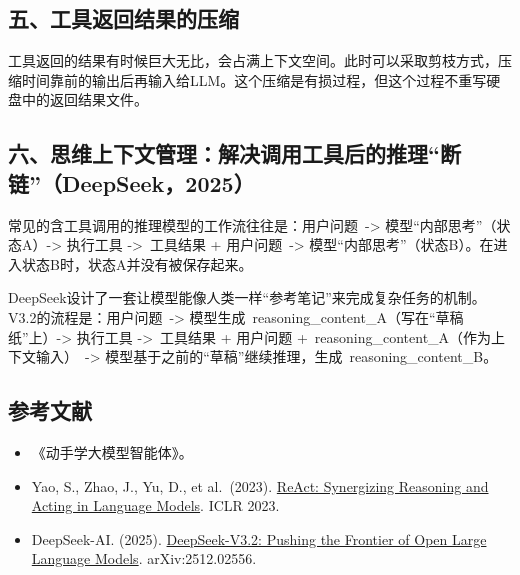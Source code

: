 \hypertarget{ux4e94ux5de5ux5177ux8fd4ux56deux7ed3ux679cux7684ux538bux7f29}{%
\subsection{五、工具返回结果的压缩}\label{ux4e94ux5de5ux5177ux8fd4ux56deux7ed3ux679cux7684ux538bux7f29}}

工具返回的结果有时候巨大无比，会占满上下文空间。此时可以采取剪枝方式，压缩时间靠前的输出后再输入给LLM。这个压缩是有损过程，但这个过程不重写硬盘中的返回结果文件。

\hypertarget{ux516dux601dux7ef4ux4e0aux4e0bux6587ux7ba1ux7406ux89e3ux51b3ux8c03ux7528ux5de5ux5177ux540eux7684ux63a8ux7406ux65adux94fedeepseek2025}{%
\subsection{六、思维上下文管理：解决调用工具后的推理``断链''（DeepSeek，2025）}\label{ux516dux601dux7ef4ux4e0aux4e0bux6587ux7ba1ux7406ux89e3ux51b3ux8c03ux7528ux5de5ux5177ux540eux7684ux63a8ux7406ux65adux94fedeepseek2025}}

常见的含工具调用的推理模型的工作流往往是：用户问题~-\textgreater{} 模型``内部思考''（状态A）-\textgreater{} 执行工具 -\textgreater~工具结果 + 用户问题~-\textgreater{} 模型``内部思考''（状态B）。在进入状态B时，状态A并没有被保存起来。

DeepSeek设计了一套让模型能像人类一样``参考笔记''来完成复杂任务的机制。V3.2的流程是：用户问题~-\textgreater{} 模型生成~reasoning\_content\_A（写在``草稿纸''上）-\textgreater{} 执行工具 -\textgreater~工具结果 + 用户问题 +~reasoning\_content\_A（作为上下文输入）~-\textgreater{} 模型基于之前的``草稿''继续推理，生成~reasoning\_content\_B。

\hypertarget{ux53c2ux8003ux6587ux732e-120}{%
\subsection{参考文献}\label{ux53c2ux8003ux6587ux732e-120}}

\begin{itemize}
\tightlist
\item
  《动手学大模型智能体》。
\item
  Yao, S., Zhao, J., Yu, D., et al.~(2023). \href{https://arxiv.org/abs/2210.03629}{ReAct: Synergizing Reasoning and Acting in Language Models}. ICLR 2023.
\item
  DeepSeek-AI. (2025). \href{https://arxiv.org/abs/2512.02556}{DeepSeek-V3.2: Pushing the Frontier of Open Large Language Models}. arXiv:2512.02556.
\end{itemize}

